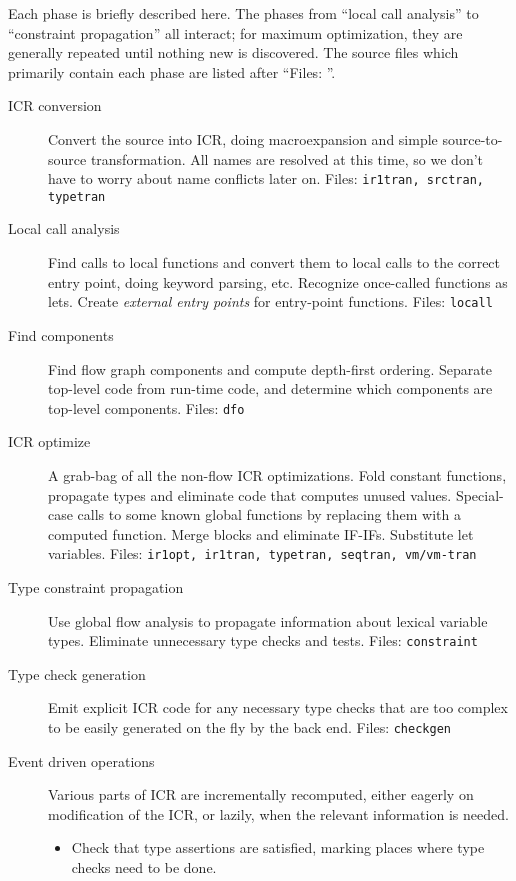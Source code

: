 Each phase is briefly described here.  The phases from ``local call analysis''
to ``constraint propagation'' all interact; for maximum optimization, they
are generally repeated until nothing new is discovered.  The source files which
primarily contain each phase are listed after ``Files: ''.
\begin{description}

\item[ICR conversion]
Convert the source into ICR, doing macroexpansion and simple source-to-source
transformation.  All names are resolved at this time, so we don't have to worry
about name conflicts later on.  Files: {\tt ir1tran, srctran, typetran}

\item[Local call analysis] Find calls to local functions and convert them to
local calls to the correct entry point, doing keyword parsing, etc.  Recognize
once-called functions as lets.  Create {\it external entry points} for
entry-point functions.  Files: {\tt locall}

\item[Find components]
Find flow graph components and compute depth-first ordering.  Separate
top-level code from run-time code, and determine which components are top-level
components.  Files: {\tt dfo}

\item[ICR optimize] A grab-bag of all the non-flow ICR optimizations.  Fold
constant functions, propagate types and eliminate code that computes unused
values.  Special-case calls to some known global functions by replacing them
with a computed function.  Merge blocks and eliminate IF-IFs.  Substitute let
variables.  Files: {\tt ir1opt, ir1tran, typetran, seqtran, vm/vm-tran}

\item[Type constraint propagation]
Use global flow analysis to propagate information about lexical variable
types.   Eliminate unnecessary type checks and tests.  Files: {\tt constraint}

\item[Type check generation]
Emit explicit ICR code for any necessary type checks that are too complex to be
easily generated on the fly by the back end.  Files: {\tt checkgen}

\item[Event driven operations]
Various parts of ICR are incrementally recomputed, either eagerly on
modification of the ICR, or lazily, when the relevant information is needed.
\begin{itemize}
\item Check that type assertions are satisfied, marking places where type
checks need to be done.


\end{itemize}
\end{description}
